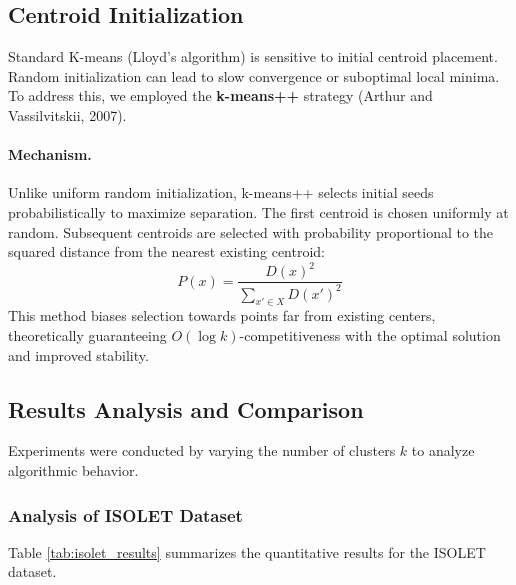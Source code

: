 \documentclass[12pt]{article}
\begin{document}
\subsection{Centroid Initialization}

Standard K-means (Lloyd's algorithm) is sensitive to initial centroid placement. Random initialization can lead to slow convergence or suboptimal local minima. To address this, we employed the \textbf{k-means++} strategy (Arthur and Vassilvitskii, 2007).

\paragraph{Mechanism.} Unlike uniform random initialization, k-means++ selects initial seeds probabilistically to maximize separation. The first centroid is chosen uniformly at random. Subsequent centroids are selected with probability proportional to the squared distance from the nearest existing centroid:
\begin{equation}
    P(x) = \frac{D(x)^2}{\sum_{x' \in X} D(x')^2}
\end{equation}
This method biases selection towards points far from existing centers, theoretically guaranteeing $O(\log k)$-competitiveness with the optimal solution and improved stability.

\subsection{Results Analysis and Comparison}

Experiments were conducted by varying the number of clusters $k$ to analyze algorithmic behavior.

\subsubsection{Analysis of ISOLET Dataset}
Table \ref{tab:isolet_results} summarizes the quantitative results for the ISOLET dataset.
\end{document}
